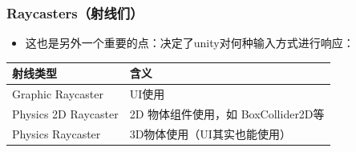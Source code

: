 \documentclass[9pt, b5paper]{article}
\begin{document}
\subsubsection{Raycasters（射线们）}
\label{sec:orgfcfaad1}
\begin{itemize}
\item 这也是另外一个重要的点：决定了unity对何种输入方式进行响应：
\end{itemize}
\begin{center}
\begin{tabular}{ll}
\hline
射线类型 & 含义\\
\hline
Graphic Raycaster & UI使用\\
Physics 2D Raycaster & 2D 物体组件使用，如 BoxCollider2D等\\
Physics Raycaster & 3D物体使用（UI其实也能使用）\\
\hline
\end{tabular}
\end{center}
\end{document}
